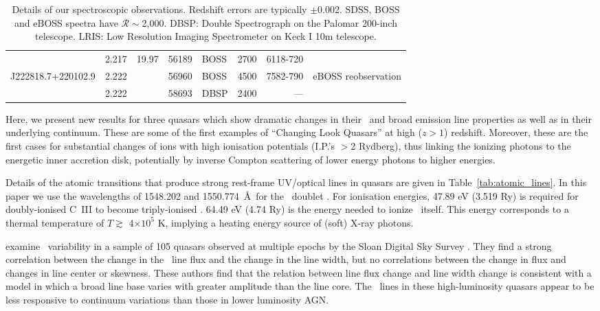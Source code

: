 \documentclass[fleqn,usenatbib]{mnras}
\begin{document}
\begin{table}
\begin{tabular}{l l   r ll  r r l}
                                      & 2.217                               & 19.97          &  56189                    &  BOSS                                    &  2700            &   6118-720          & \\
 J222818.7+220102.9   & 2.222                               &                    &  56960                     & BOSS                                    &  4500            &   7582-790          & eBOSS reobservation \\ 
                                     &  2.222                               &                    &  58693                    &  DBSP                                    & 2400             &    ---                        &    \\
    \hline \hline   
  \end{tabular}
  \caption{Details of our spectroscopic observations.  Redshift errors are
    typically $\pm$0.002.  SDSS, BOSS and eBOSS spectra have
    $\mathcal{R}\sim$2,000.  DBSP: Double Spectrograph on the Palomar
    200-inch telescope.  LRIS: Low Resolution Imaging Spectrometer on Keck
    I 10m telescope.} 
  \label{tab:obs_notes}
\end{table}

Here, we present new results for three quasars which show dramatic
changes in their \civ\ and \ciii broad emission line properties as
well as in their underlying continuum. These are some of the first
examples of ``Changing Look Quasars'' at high ($z>1$)
redshift. Moreover, these are the first cases for substantial changes
of ions with high ionisation potentials (I.P.'s $>$2 Rydberg), thus
linking the ionizing photons to the energetic inner accretion disk,
potentially by inverse Compton scattering of lower energy photons to
higher energies.

Details of the atomic transitions that produce strong rest-frame
UV/optical lines in quasars are given in
Table~\ref{tab:atomic_lines}. In this paper we use the wavelengths of
1548.202 and 1550.774~\AA\ for the \civ\ doublet
\citep{Kramida2018}. For ionisation energies, 47.89 eV (3.519 Ry) is
required for doubly-ionised C~III to become triply-ionised \civ.
64.49 eV (4.74 Ry) is the energy needed to ionize \civ\ itself. This
energy corresponds to a thermal temperature of $T \gtrsim$
4$\times10^{5}$ K, implying a heating energy source of (soft) X-ray
photons. 

\citet{Wilhite2006} examine \civ\ variability in a sample
of 105 quasars observed at multiple epochs by the Sloan Digital Sky
Survey \citep[SDSS;][]{York2000, Stoughton2002, Abazajian2009}.  They
find a strong correlation between the change in the \civ\ line
flux and the change in the line width, but no correlations between the
change in flux and changes in line center or skewness.  These authors
find that the relation between line flux change and line width change
is consistent with a model in which a broad line base varies with
greater amplitude than the line core. The \civ\ lines in these
high-luminosity quasars appear to be less responsive to continuum
variations than those in lower luminosity AGN.
\end{document}
